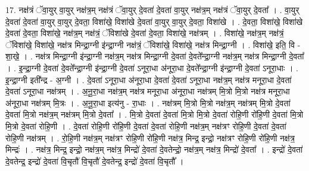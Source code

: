 \documentclass[17pt]{extarticle}
\begin{document}
17. नक्ष॑त्रं ॅवा॒युर् वा॒युर् नक्ष॑त्र॒म् नक्ष॑त्रं ॅवा॒युर् दे॒वता॑ दे॒वता॑ वा॒युर् नक्ष॑त्र॒म् नक्ष॑त्रं ॅवा॒युर् दे॒वता᳚ । . वा॒युर् दे॒वता॑ दे॒वता॑ वा॒युर् वा॒युर् दे॒वता॒ विशा॑खे॒ विशा॑खे दे॒वता॑ वा॒युर् वा॒युर् दे॒वता॒ विशा॑खे । . दे॒वता॒ विशा॑खे॒ विशा॑खे दे॒वता॑ दे॒वता॒ विशा॑खे॒ नक्ष॑त्र॒म् नक्ष॑त्रं॒ ॅविशा॑खे दे॒वता॑ दे॒वता॒ विशा॑खे॒ नक्ष॑त्रम् । . विशा॑खे॒ नक्ष॑त्र॒म् नक्ष॑त्रं॒ ॅविशा॑खे॒ विशा॑खे॒ नक्ष॑त्र मिन्द्रा॒ग्नी इ॑न्द्रा॒ग्नी नक्ष॑त्रं॒ ॅविशा॑खे॒ विशा॑खे॒ नक्ष॑त्र मिन्द्रा॒ग्नी । . विशा॑खे॒ इति॒ वि - शा॒खे॒ । . नक्ष॑त्र मिन्द्रा॒ग्नी इ॑न्द्रा॒ग्नी नक्ष॑त्र॒म् नक्ष॑त्र मिन्द्रा॒ग्नी दे॒वता॑ दे॒वते᳚न्द्रा॒ग्नी नक्ष॑त्र॒म् नक्ष॑त्र मिन्द्रा॒ग्नी दे॒वता᳚ । . इ॒न्द्रा॒ग्नी दे॒वता॑ दे॒वते᳚न्द्रा॒ग्नी इ॑न्द्रा॒ग्नी दे॒वता॑ ऽनूरा॒धा अ॑नूरा॒धा दे॒वते᳚न्द्रा॒ग्नी इ॑न्द्रा॒ग्नी दे॒वता॑ ऽनूरा॒धाः । . इ॒न्द्रा॒ग्नी इती᳚न्द्र - अ॒ग्नी । . दे॒वता॑ ऽनूरा॒धा अ॑नूरा॒धा दे॒वता॑ दे॒वता॑ ऽनूरा॒धा नक्ष॑त्र॒म् नक्ष॑त्र मनूरा॒धा दे॒वता॑ दे॒वता॑ ऽनूरा॒धा नक्ष॑त्रम् । . अ॒नू॒रा॒धा नक्ष॑त्र॒म् नक्ष॑त्र मनूरा॒धा अ॑नूरा॒धा नक्ष॑त्रम् मि॒त्रो मि॒त्रो नक्ष॑त्र मनूरा॒धा अ॑नूरा॒धा नक्ष॑त्रम् मि॒त्रः । . अ॒नू॒रा॒धा इत्य॑नु - रा॒धाः । . नक्ष॑त्रम् मि॒त्रो मि॒त्रो नक्ष॑त्र॒म् नक्ष॑त्रम् मि॒त्रो दे॒वता॑ दे॒वता॑ मि॒त्रो नक्ष॑त्र॒म् नक्ष॑त्रम् मि॒त्रो दे॒वता᳚ । . मि॒त्रो दे॒वता॑ दे॒वता॑ मि॒त्रो मि॒त्रो दे॒वता॑ रोहि॒णी रो॑हि॒णी दे॒वता॑ मि॒त्रो मि॒त्रो दे॒वता॑ रोहि॒णी । . दे॒वता॑ रोहि॒णी रो॑हि॒णी दे॒वता॑ दे॒वता॑ रोहि॒णी नक्ष॑त्र॒म् नक्ष॑त्रꣳ रोहि॒णी दे॒वता॑ दे॒वता॑ रोहि॒णी नक्ष॑त्रम् । . रो॒हि॒णी नक्ष॑त्र॒म् नक्ष॑त्रꣳ रोहि॒णी रो॑हि॒णी नक्ष॑त्र॒ मिन्द्र॒ इन्द्रो॒ नक्ष॑त्रꣳ रोहि॒णी रो॑हि॒णी नक्ष॑त्र॒ मिन्द्रः॑ । . नक्ष॑त्र॒ मिन्द्र॒ इन्द्रो॒ नक्ष॑त्र॒म् नक्ष॑त्र॒ मिन्द्रो॑ दे॒वता॑ दे॒वतेन्द्रो॒ नक्ष॑त्र॒म् नक्ष॑त्र॒ मिन्द्रो॑ दे॒वता᳚ । . इन्द्रो॑ दे॒वता॑ दे॒वतेन्द्र॒ इन्द्रो॑ दे॒वता॑ वि॒चृतौ॑ वि॒चृतौ॑ दे॒वतेन्द्र॒ इन्द्रो॑ दे॒वता॑ वि॒चृतौ᳚ । \newline
\end{document}
